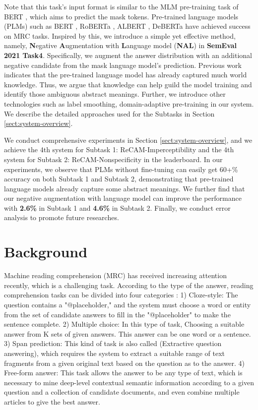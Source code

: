 \documentclass[11pt,a4paper]{article}
\begin{document}
Note that this task's input format is similar to the MLM pre-training task of BERT \cite{devlin_bert_2019}, which aims to predict the mask tokens. 
Pre-trained language models (PLMs) such as BERT  \cite{devlin_bert_2019}, RoBERTa \cite{roberta}, ALBERT \cite{lan_albert_2020}, DeBERTa \cite{he_deberta_2021}  have achieved success on MRC tasks. 
Inspired by this, we introduce a simple yet effective method, namely, \textbf{N}egative \textbf{A}ugmentation with \textbf{L}anguage model (\textbf{NAL}) in \textbf{SemEval 2021 Task4}. 
Specifically, we augment the answer distribution with an additional negative candidate from the mask language model's prediction. 
Previous work \cite{petroni-etal-2019-language,zhou2020evaluating} indicates that the pre-trained language model has already captured much world knowledge.
Thus, we argue that knowledge can help guild the model training and identify those ambiguous abstract meanings. 
Further, we introduce other technologies such as label smoothing, domain-adaptive pre-training in our system.
We describe the detailed approaches used for the Subtasks in Section \ref{sect:system-overview}.

We conduct comprehensive experiments in Section \ref{sect:system-overview}, and we achieve the 4th system for Subtask 1: ReCAM-Imperceptibility and the 4th system for Subtask 2: ReCAM-Nonspecificity in the leaderboard. In our experiments, we observe that  PLMs without fine-tuning can easily get 60+\% accuracy on both Subtask 1 and Subtask 2, demonstrating that pre-trained language models already capture some abstract meanings. We further find that our negative augmentation with language model can improve the performance with \textbf{2.6\%} in Subtask 1 and \textbf{4.6\%} in Subtask 2. Finally, we conduct error analysis to promote future researches. 

\section{Background}
Machine reading comprehension (MRC) has received increasing attention recently, which is a challenging task.
According to the type of the answer, reading comprehension tasks can be divided into four categories \cite{chen-2018neural}: 
1) Cloze-style: The question contains a "@placeholder," and the system must choose a word or entity from the set of candidate answers to fill in the "@placeholder" to make the sentence complete.
2) Multiple choice: In this type of task, Choosing a suitable answer from K sets of given answers. This answer can be one word or a sentence. 
3) Span prediction: This kind of task is also called (Extractive question answering), which requires the system to extract a suitable range of text fragments from a given original text based on the question as to the answer. 
4) Free-form answer: This task allows the answer to be any type of text, which is necessary to mine deep-level contextual semantic information according to a given question and a collection of candidate documents, and even combine multiple articles to give the best answer. 
\end{document}
